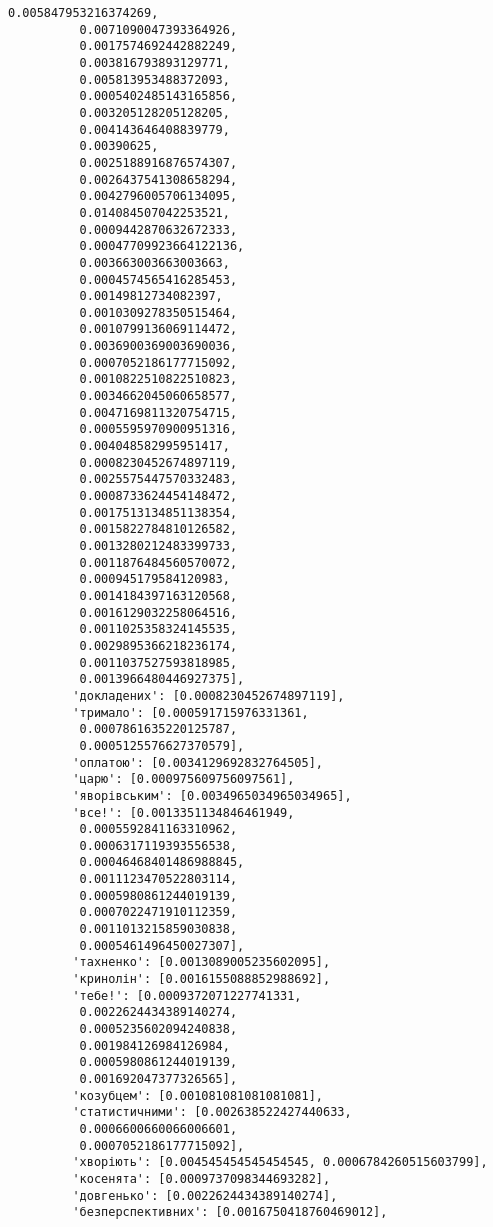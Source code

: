 \documentclass[11pt]{article}
\begin{document}
\begin{Verbatim}[commandchars=\\\{\}]
          0.005847953216374269,
          0.0071090047393364926,
          0.0017574692442882249,
          0.003816793893129771,
          0.005813953488372093,
          0.0005402485143165856,
          0.003205128205128205,
          0.004143646408839779,
          0.00390625,
          0.0025188916876574307,
          0.0026437541308658294,
          0.0042796005706134095,
          0.014084507042253521,
          0.0009442870632672333,
          0.00047709923664122136,
          0.003663003663003663,
          0.0004574565416285453,
          0.00149812734082397,
          0.0010309278350515464,
          0.0010799136069114472,
          0.0036900369003690036,
          0.0007052186177715092,
          0.0010822510822510823,
          0.0034662045060658577,
          0.0047169811320754715,
          0.0005595970900951316,
          0.004048582995951417,
          0.0008230452674897119,
          0.0025575447570332483,
          0.0008733624454148472,
          0.0017513134851138354,
          0.0015822784810126582,
          0.0013280212483399733,
          0.0011876484560570072,
          0.000945179584120983,
          0.0014184397163120568,
          0.0016129032258064516,
          0.0011025358324145535,
          0.0029895366218236174,
          0.0011037527593818985,
          0.0013966480446927375],
         'докладених': [0.0008230452674897119],
         'тримало': [0.000591715976331361,
          0.0007861635220125787,
          0.0005125576627370579],
         'оплатою': [0.0034129692832764505],
         'царю': [0.000975609756097561],
         'яворівським': [0.0034965034965034965],
         'все!': [0.0013351134846461949,
          0.0005592841163310962,
          0.0006317119393556538,
          0.00046468401486988845,
          0.0011123470522803114,
          0.0005980861244019139,
          0.0007022471910112359,
          0.0011013215859030838,
          0.0005461496450027307],
         'тахненко': [0.0013089005235602095],
         'кринолін': [0.0016155088852988692],
         'тебе!': [0.0009372071227741331,
          0.0022624434389140274,
          0.0005235602094240838,
          0.001984126984126984,
          0.0005980861244019139,
          0.001692047377326565],
         'козубцем': [0.001081081081081081],
         'статистичними': [0.002638522427440633,
          0.0006600660066006601,
          0.0007052186177715092],
         'хворіють': [0.004545454545454545, 0.0006784260515603799],
         'косенята': [0.0009737098344693282],
         'довгенько': [0.0022624434389140274],
         'безперспективних': [0.0016750418760469012],

\end{Verbatim}
\end{document}
